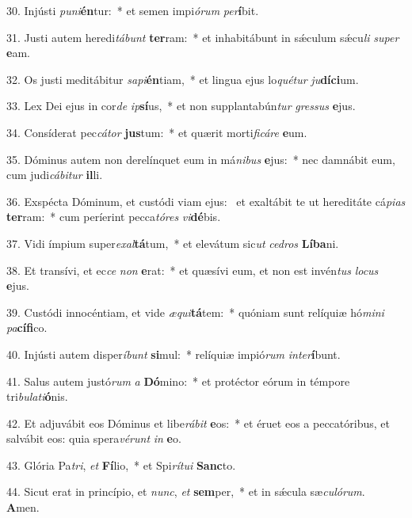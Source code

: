 30. Injústi \textit{pu}\textit{ni}\textbf{én}tur:~*  et semen impi\textit{ó}\textit{rum} \textit{per}\textbf{í}bit.\

31. Justi autem heredi\textit{tá}\textit{bunt} \textbf{ter}ram:~*  et inhabitábunt in sǽculum sǽcu\textit{li} \textit{su}\textit{per} \textbf{e}am.\

32. Os justi meditábitur \textit{sa}\textit{pi}\textbf{én}tiam,~*  et lingua ejus lo\textit{qué}\textit{tur} \textit{ju}\textbf{dí}\textbf{ci}um.\

33. Lex Dei ejus in cor\textit{de} \textit{ip}\textbf{sí}us,~*  et non supplantabún\textit{tur} \textit{gres}\textit{sus} \textbf{e}jus.\

34. Consíderat pec\textit{cá}\textit{tor} \textbf{jus}tum:~*  et quærit morti\textit{fi}\textit{cá}\textit{re} \textbf{e}um.\

35. Dóminus autem non derelínquet eum in má\textit{ni}\textit{bus} \textbf{e}jus:~*  nec damnábit eum, cum judi\textit{cá}\textit{bi}\textit{tur} \textbf{il}li.\

36. Exspécta Dóminum, et custódi viam ejus: \dag\  et exaltábit te ut hereditáte cá\textit{pi}\textit{as} \textbf{ter}ram:~*  cum períerint pecca\textit{tó}\textit{res} \textit{vi}\textbf{dé}bis.\

37. Vidi ímpium super\textit{ex}\textit{al}\textbf{tá}tum,~*  et elevátum sic\textit{ut} \textit{ce}\textit{dros} \textbf{Lí}\textbf{ba}ni.\

38. Et transívi, et ec\textit{ce} \textit{non} \textbf{e}rat:~*  et quæsívi eum, et non est invén\textit{tus} \textit{lo}\textit{cus} \textbf{e}jus.\

39. Custódi innocéntiam, et vide \textit{æ}\textit{qui}\textbf{tá}tem:~*  quóniam sunt relíquiæ hó\textit{mi}\textit{ni} \textit{pa}\textbf{cí}\textbf{fi}co.\

40. Injústi autem disper\textit{í}\textit{bunt} \textbf{si}mul:~*  relíquiæ impió\textit{rum} \textit{in}\textit{ter}\textbf{í}bunt.\

41. Salus autem justó\textit{rum} \textit{a} \textbf{Dó}mino:~*  et protéctor eórum in témpore tri\textit{bu}\textit{la}\textit{ti}\textbf{ó}nis.\

42. Et adjuvábit eos Dóminus et libe\textit{rá}\textit{bit} \textbf{e}os:~*  et éruet eos a peccatóribus, et salvábit eos: quia spera\textit{vé}\textit{runt} \textit{in} \textbf{e}o.\

43. Glória Pa\textit{tri}, \textit{et} \textbf{Fí}lio,~*  et Spi\textit{rí}\textit{tu}\textit{i} \textbf{Sanc}to.\

44. Sicut erat in princípio, et \textit{nunc}, \textit{et} \textbf{sem}per,~*  et in sǽcula sæ\textit{cu}\textit{ló}\textit{rum}. \textbf{A}men.\

